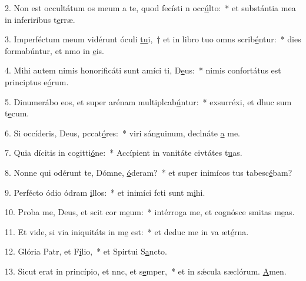 2. Non est occultátum os meum a te, quod fecísti n occ\uline{ú}lto:~* et substántia mea in inferiribus t\uline{e}rræ.\par 
3. Imperféctum meum vidérunt óculi \uline{tu}i,~† et in libro tuo omns scrib\uline{é}ntur:~* dies formabúntur, et nmo in \uline{e}is.\par 
4. Mihi autem nimis honorificáti sunt amíci ti, D\uline{e}us:~* nimis confortátus est principtus e\uline{ó}rum.\par 
5. Dinumerábo eos, et super arénam multiplcab\uline{ú}ntur:~* exsurréxi, et dhuc sum t\uline{e}cum.\par 
6. Si occíderis, Deus, pccat\uline{ó}res:~* viri sánguinum, declnáte \uline{a} me.\par 
7. Quia dícitis in cogitti\uline{ó}ne:~* Accípient in vanitáte civtátes t\uline{u}as.\par 
8. Nonne qui odérunt te, Dómne, \uline{ó}deram?~* et super inimícos tus tabesc\uline{é}bam?\par 
9. Perfécto ódio ódram \uline{i}llos:~* et inimíci fcti sunt m\uline{i}hi.\par 
10. Proba me, Deus, et scit cor m\uline{e}um:~* intérroga me, et cognósce smitas m\uline{e}as.\par 
11. Et vide, si via iniquitáts in m\uline{e} est:~* et deduc me in va æt\uline{é}rna.\par 
12. Glória Patr, et F\uline{í}lio,~* et Spirtui S\uline{a}ncto.\par 
13. Sicut erat in princípio, et nnc, et s\uline{e}mper,~* et in sǽcula sæclórum. \uline{A}men.\par 
